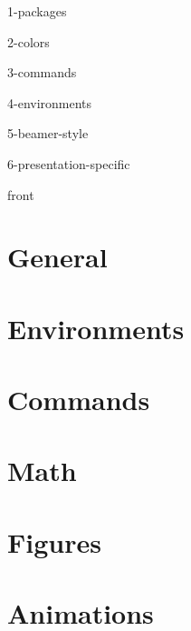 \def\shareable{1}
\newcommand{\configpath}{../.config/}
\newcommand{\specificpath}{../.config/}

\usepackage{import}

{1-packages}

{2-colors}

{3-commands}

{4-environments}

{5-beamer-style}

{6-presentation-specific}

{front} %

\section{General}


\section{Environments}


\section{Commands}


\section{Math}


\section{Figures}


\section{Animations}


